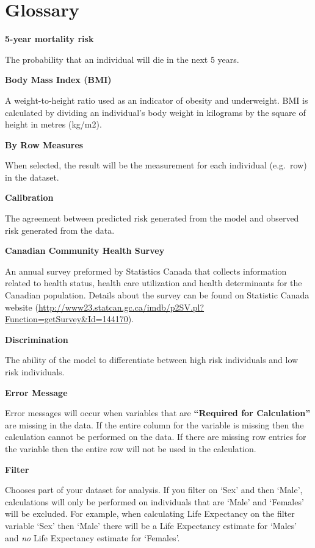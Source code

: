 \documentclass[]{book}
\begin{document}
\hypertarget{glossary}{%
\chapter{Glossary}\label{glossary}}

\textbf{5-year mortality risk}

The probability that an individual will die in the next 5 years.

\textbf{Body Mass Index (BMI)}

A weight-to-height ratio used as an indicator of obesity and underweight. BMI is calculated by dividing an individual's body weight in kilograms by the square of height in metres (kg/m2).

\textbf{By Row Measures}

When selected, the result will be the measurement for each individual (e.g.~row) in the dataset.

\textbf{Calibration}

The agreement between predicted risk generated from the model and observed risk generated from the data.

\textbf{Canadian Community Health Survey}

An annual survey preformed by Statistics Canada that collects information related to health status, health care utilization and health determinants for the Canadian population. Details about the survey can be found on Statistic Canada website (\url{http://www23.statcan.gc.ca/imdb/p2SV.pl?Function=getSurvey\&Id=144170}).

\textbf{Discrimination}

The ability of the model to differentiate between high risk individuals and low risk individuals.

\textbf{Error Message}

Error messages will occur when variables that are \textbf{``Required for Calculation''} are missing in the data. If the entire column for the variable is missing then the calculation cannot be performed on the data. If there are missing row entries for the variable then the entire row will not be used in the calculation.

\textbf{Filter}

Chooses part of your dataset for analysis. If you filter on `Sex' and then `Male', calculations will only be performed on individuals that are `Male' and `Females' will be excluded. For example, when calculating Life Expectancy on the filter variable `Sex' then `Male' there will be a Life Expectancy estimate for `Males' and \emph{no} Life Expectancy estimate for `Females'.
\end{document}
